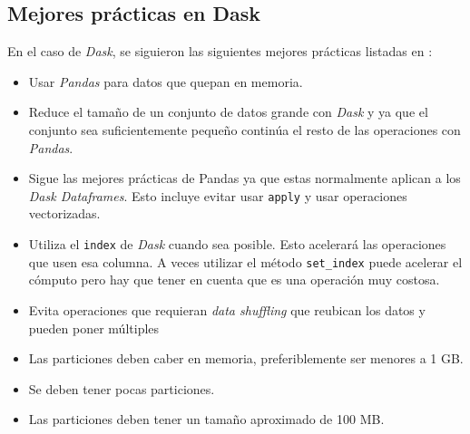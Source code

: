 \subsection{Mejores prácticas en Dask}

En el caso de \textit{Dask}, se siguieron las siguientes mejores prácticas listadas en \cite{daskbestpractices}:
\begin{itemize}
	\item Usar \textit{Pandas} para datos que quepan en memoria.
	\item Reduce el tamaño de un conjunto de datos grande con \textit{Dask} y ya que el conjunto sea suficientemente pequeño continúa el resto de las operaciones con \textit{Pandas}.
	\item Sigue las mejores prácticas de Pandas ya que estas normalmente aplican a los \textit{Dask Dataframes}. Esto incluye evitar usar \texttt{apply} y usar operaciones vectorizadas.
	\item Utiliza el \texttt{index} de \textit{Dask} cuando sea posible. Esto acelerará las operaciones que usen esa columna. A veces utilizar el método \texttt{set_index} puede acelerar el cómputo pero hay que tener en cuenta que es una operación muy costosa.
	\item Evita operaciones que requieran \textit{data shuffling} que reubican los datos y pueden poner múltiples 
	\item Las particiones deben caber en memoria, preferiblemente ser menores a 1 GB.
	\item Se deben tener pocas particiones.
	\item Las particiones deben tener un tamaño aproximado de 100 MB.
\end{itemize}

